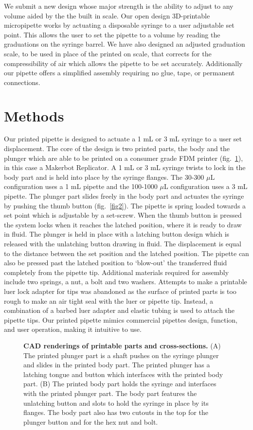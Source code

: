 \documentclass[10pt,letterpaper]{article}
\begin{document}
We submit a new design whose major strength is the ability to adjust to any volume aided by the the built in scale.
Our open design 3D-printable micropipette works by actuating a disposable syringe to a user adjustable set point.
This allows the user to set the pipette to a volume by reading the graduations on the syringe barrel.
We have also designed an adjusted graduation scale, to be used in place of the printed on scale, that corrects for the compressibility of air which allows the pipette to be set accurately.
Additionally our pipette offers a simplified assembly requiring no glue, tape, or permanent connections.

\section*{Methods}
Our printed pipette is designed to actuate a 1 mL or 3 mL syringe to a user set displacement.
The core of the design is two printed parts, the body and the plunger which are able to be printed on a consumer grade FDM printer (fig.~\ref{fig1}), in this case a Makerbot Replicator.
A 1 mL or 3 mL syringe twists to lock in the body part and is held into place by the syringe flanges.
The 30-300 $\mu$L configuration uses a 1 mL pipette and the 100-1000 $\mu$L configuration uses a 3 mL pipette.
The plunger part slides freely in the body part and actuates the syringe by pushing the thumb button (fig.~\ref{fig2}). 
The pipette is spring loaded towards a set point which is adjustable by a set-screw.
When the thumb button is pressed the system locks when it reaches the latched position, where it is ready to draw in fluid.
The plunger is held in place with a latching button design which is released with the unlatching button drawing in fluid.
The displacement is equal to the distance between the set position and the latched position.
The pipette can also be pressed past the latched position to `blow-out' the transferred fluid completely from the pipette tip.   
Additional materials required for assembly include two springs, a nut, a bolt and two washers.
Attempts to make a printable luer lock adapter for tips was abandoned as the surface of printed parts is too rough to make an air tight seal with the luer or pipette tip.
Instead, a combination of a barbed luer adapter and elastic tubing is used to attach the pipette tips.
Our printed pipette mimics commercial pipettes design, function, and user operation, making it intuitive to use.

\begin{figure}
	\caption{
		{\bf CAD renderings of printable parts and cross-sections.} (A) The printed plunger part is a shaft pushes on the syringe plunger and slides in the printed body part. The printed plunger has a latching tongue and button which interfaces with the printed body part. (B) The printed body part holds the syringe and interfaces with the printed plunger part. The body part features the unlatching button and slots to hold the syringe in place by its flanges. The body part also has two cutouts in the top for the plunger button and for the hex nut and bolt.
	}
	\label{fig1}
\end{figure}
\end{document}
